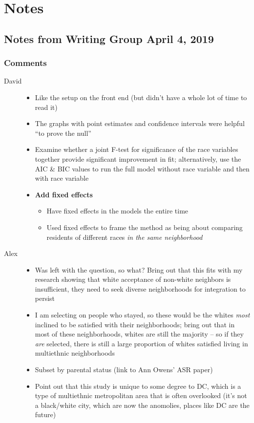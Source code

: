 \documentclass{baderart}
\providecommand{\tightlist}{%
  \setlength{\itemsep}{0pt}\setlength{\parskip}{0pt}}
\begin{document}
\section{Notes}\label{notes}

\subsection{Notes from Writing Group April 4,
2019}\label{notes-from-writing-group-april-4-2019}

\subsubsection{Comments}\label{comments}

\begin{description}
\item[David]
\begin{itemize}
\tightlist
\item
  Like the setup on the front end (but didn't have a whole lot of time
  to read it)
\item
  The graphs with point estimates and confidence intervals were helpful
  ``to prove the null''
\item
  Examine whether a joint F-test for significance of the race variables
  together provide significant improvement in fit; alternatively, use
  the AIC \& BIC values to run the full model without race variable and
  then with race variable
\item
  \textbf{Add fixed effects}

  \begin{itemize}
  \tightlist
  \item
    Have fixed effects in the models the entire time
  \item
    Used fixed effects to frame the method as being about comparing
    residents of different races \emph{in the same neighborhood}
  \end{itemize}
\end{itemize}
\item[Alex]
\begin{itemize}
\tightlist
\item
  Was left with the question, so what? Bring out that this fits with my
  research showing that white acceptance of non-white neighbors is
  insufficient, they need to seek diverse neighborhoods for integration
  to persist
\item
  I am selecting on people who stayed, so these would be the whites
  \emph{most} inclined to be satisfied with their neighborhoods; bring
  out that in most of these neighborhoods, whites are still the majority
  -- so if they \emph{are} selected, there is still a large proportion
  of whites satisfied living in multiethnic neighborhoods
\item
  Subset by parental status (link to Ann Owens' ASR paper)
\item
  Point out that this study is unique to some degree to DC, which is a
  type of multiethnic metropolitan area that is often overlooked (it's
  not a black/white city, which are now the anomolies, places like DC
  are the future)
\end{itemize}
\end{description}
\end{document}
